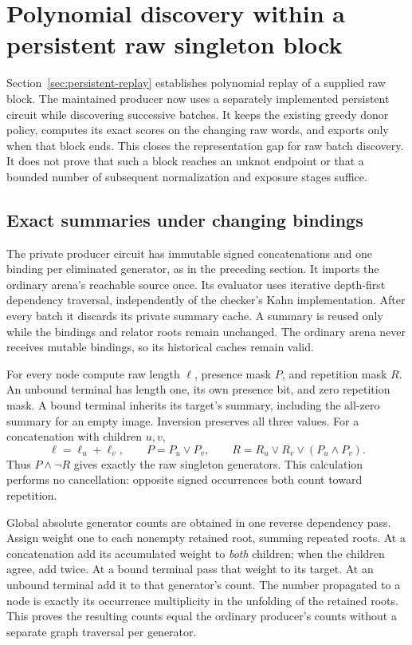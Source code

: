 \section{Polynomial discovery within a persistent raw singleton block}
\label{sec:persistent-producer}

Section~\ref{sec:persistent-replay} establishes polynomial replay of a supplied
raw block. The maintained producer now uses a separately implemented persistent
circuit while discovering successive batches. It keeps the existing greedy
donor policy, computes its exact scores on the changing raw words, and exports
only when that block ends. This closes the representation gap for raw batch
discovery. It does not prove that such a block reaches an unknot endpoint or
that a bounded number of subsequent normalization and exposure stages suffice.

\subsection{Exact summaries under changing bindings}

The private producer circuit has immutable signed concatenations and one binding
per eliminated generator, as in the preceding section. It imports the ordinary
arena's reachable source once. Its evaluator uses iterative depth-first
dependency traversal, independently of the checker's Kahn implementation.
After every batch it discards its private summary cache. A summary is reused
only while the bindings and relator roots remain unchanged. The ordinary arena
never receives mutable bindings, so its historical caches remain valid.

For every node compute raw length $\ell$, presence mask $P$, and repetition
mask $R$. An unbound terminal has length one, its own presence bit, and zero
repetition mask. A bound terminal inherits its target's summary, including
the all-zero summary for an empty image. Inversion preserves all three values.
For a concatenation with children $u,v$,
\[
 \ell=\ell_u+\ell_v,\qquad P=P_u\mathbin\lor P_v,\qquad
 R=R_u\mathbin\lor R_v\mathbin\lor(P_u\mathbin\land P_v).
\]
Thus $P\mathbin\land\neg R$ gives exactly the raw singleton generators.
This calculation performs no cancellation: opposite signed occurrences both
count toward repetition.

Global absolute generator counts are obtained in one reverse dependency pass.
Assign weight one to each nonempty retained root, summing repeated roots.
At a concatenation add its accumulated weight to \emph{both} children; when
the children agree, add twice. At a bound terminal pass that weight to its
target. At an unbound terminal add it to that generator's count. The number
propagated to a node is exactly its occurrence multiplicity in the unfolding
of the retained roots. This proves the resulting counts equal the ordinary
producer's counts without a separate graph traversal per generator.

